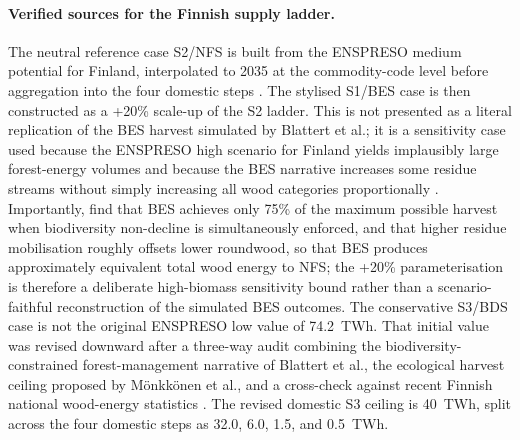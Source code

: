 \documentclass{article}
\begin{document}
\paragraph{Verified sources for the Finnish supply ladder.}
The neutral reference case S2/NFS is built from the ENSPRESO medium potential for Finland, interpolated to 2035 at the commodity-code level before aggregation into the four domestic steps \citep{ruizENSPRESOOpenEU282019}. The stylised S1/BES case is then constructed as a +20\% scale-up of the S2 ladder. This is not presented as a literal replication of the BES harvest simulated by Blattert et al.; it is a sensitivity case used because the ENSPRESO high scenario for Finland yields implausibly large forest-energy volumes and because the BES narrative increases some residue streams without simply increasing all wood categories proportionally \citep{blattertSectoralPoliciesCause2022}. Importantly, \citet{blattertSectoralPoliciesCause2022} find that BES achieves only 75\% of the maximum possible harvest when biodiversity non-decline is simultaneously enforced, and that higher residue mobilisation roughly offsets lower roundwood, so that BES produces approximately equivalent total wood energy to NFS; the +20\% parameterisation is therefore a deliberate high-biomass sensitivity bound rather than a scenario-faithful reconstruction of the simulated BES outcomes. The conservative S3/BDS case is not the original ENSPRESO low value of 74.2~TWh. That initial value was revised downward after a three-way audit combining the biodiversity-constrained forest-management narrative of Blattert et al., the ecological harvest ceiling proposed by M\"onkk\"onen et al., and a cross-check against recent Finnish national wood-energy statistics \citep{blattertSectoralPoliciesCause2022,monkkonenEcologicallyEconomicallySustainable2024,lukeWoodEnergy2024}. The revised domestic S3 ceiling is 40~TWh, split across the four domestic steps as 32.0, 6.0, 1.5, and 0.5~TWh.
\end{document}
